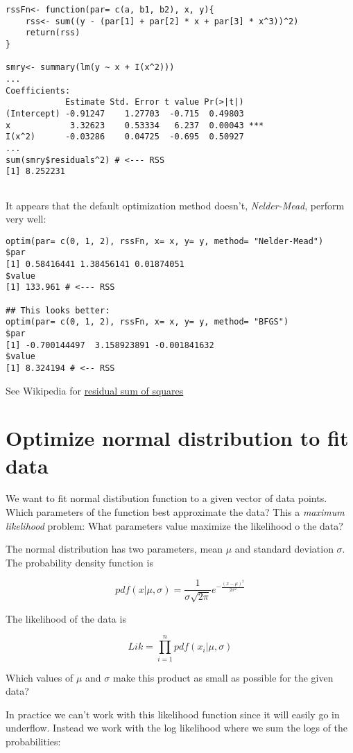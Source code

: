 \documentclass[a4paper]{article}
\begin{document}
\begin{verbatim}
rssFn<- function(par= c(a, b1, b2), x, y){
    rss<- sum((y - (par[1] + par[2] * x + par[3] * x^3))^2)
    return(rss)
}

smry<- summary(lm(y ~ x + I(x^2)))
...
Coefficients:
            Estimate Std. Error t value Pr(>|t|)    
(Intercept) -0.91247    1.27703  -0.715  0.49803    
x            3.32623    0.53334   6.237  0.00043 ***
I(x^2)      -0.03286    0.04725  -0.695  0.50927    
...
sum(smry$residuals^2) # <--- RSS
[1] 8.252231


\end{verbatim}

It appears that the default optimization method doesn't, \emph{Nelder-Mead}, perform very well:

\begin{verbatim}
optim(par= c(0, 1, 2), rssFn, x= x, y= y, method= "Nelder-Mead")
$par
[1] 0.58416441 1.38456141 0.01874051
$value
[1] 133.961 # <--- RSS

## This looks better:
optim(par= c(0, 1, 2), rssFn, x= x, y= y, method= "BFGS")
$par
[1] -0.700144497  3.158923891 -0.001841632
$value
[1] 8.324194 # <-- RSS
\end{verbatim}

See Wikipedia for \href{https://en.wikipedia.org/wiki/Residual_sum_of_squares}{residual sum of squares}

\section{Optimize normal distribution to fit data}

We want to fit normal distibution function to a given vector of data points.
Which parameters of the function best approximate the data?
This a \emph{maximum likelihood} problem: What parameters value maximize the likelihood o the data?

The normal distribution has two parameters, mean $\mu$ and standard deviation $\sigma$. The probability density function is

$$
pdf(x | \mu, \sigma) = \frac{1}{\sigma \sqrt{2 \pi}} e^{-\frac{(x - \mu)^2}{2 \sigma^2}}
$$

The likelihood of the data is

$$
Lik= \prod_{i= 1}^{n} pdf(x_i | \mu, \sigma)
$$

Which values of $\mu$ and $\sigma$ make this product as small as possible for the given data?

In practice we can't work with this likelihood function since it will easily go in underflow.
Instead we work with the log likelihood where we sum the logs of the probabilities:
\end{document}
